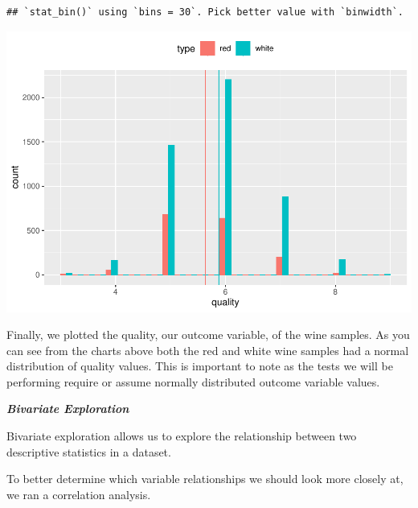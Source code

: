 \documentclass[
]{book}
\newenvironment{Shaded}{\begin{snugshade}}{\end{snugshade}}
\newcommand{\AttributeTok}[1]{\textcolor[rgb]{0.77,0.63,0.00}{#1}}
\newcommand{\CommentTok}[1]{\textcolor[rgb]{0.56,0.35,0.01}{\textit{#1}}}
\newcommand{\ConstantTok}[1]{\textcolor[rgb]{0.00,0.00,0.00}{#1}}
\newcommand{\DecValTok}[1]{\textcolor[rgb]{0.00,0.00,0.81}{#1}}
\newcommand{\FunctionTok}[1]{\textcolor[rgb]{0.00,0.00,0.00}{#1}}
\newcommand{\NormalTok}[1]{#1}
\newcommand{\OtherTok}[1]{\textcolor[rgb]{0.56,0.35,0.01}{#1}}
\newcommand{\SpecialCharTok}[1]{\textcolor[rgb]{0.00,0.00,0.00}{#1}}
\begin{document}
\begin{verbatim}
## `stat_bin()` using `bins = 30`. Pick better value with `binwidth`.
\end{verbatim}

\includegraphics{FinalProject-Bright-Santoro_files/figure-latex/unnamed-chunk-5-1.pdf}

Finally, we plotted the quality, our outcome variable, of the wine samples. As you can see from the charts above both the red and white wine samples had a normal distribution of quality values. This is important to note as the tests we will be performing require or assume normally distributed outcome variable values.

\textbf{\emph{Bivariate Exploration}}

Bivariate exploration allows us to explore the relationship between two descriptive statistics in a dataset.

To better determine which variable relationships we should look more closely at, we ran a correlation analysis.

\begin{Shaded}
\end{Shaded}
\end{document}
